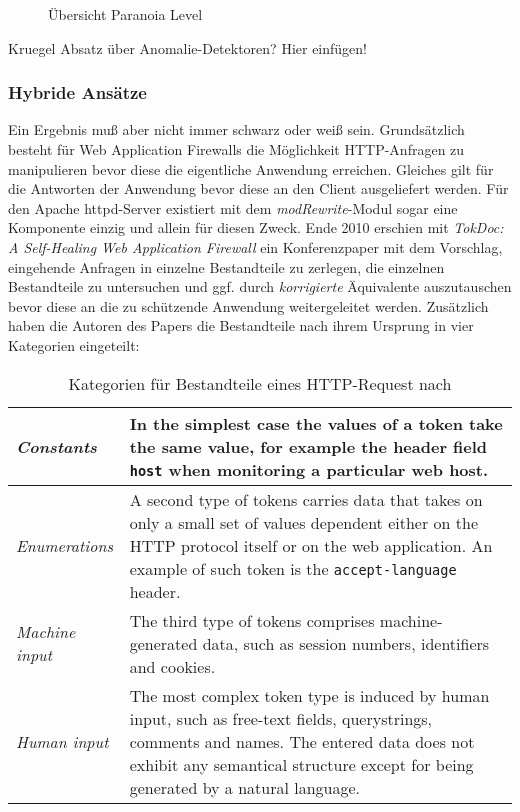 \begin{figure}[ht]
  \centering
  
  \caption{Übersicht Paranoia Level \cite{owaspcrs}}
  \label{fig.paranoia}
\end{figure}



\begin{neu}
  Kruegel Absatz über Anomalie-Detektoren? Hier einfügen!
\end{neu}

\subsubsection{Hybride Ansätze} %
Ein Ergebnis muß aber nicht immer schwarz oder weiß sein.  Grundsätzlich besteht für Web Application Firewalls die Möglichkeit HTTP-Anfragen zu manipulieren bevor diese die eigentliche Anwendung erreichen. Gleiches gilt für die Antworten der Anwendung bevor diese an den Client ausgeliefert werden. Für den Apache httpd-Server existiert mit dem \emph{modRewrite}-Modul sogar eine Komponente einzig und allein für diesen Zweck. Ende 2010 erschien mit \glqq\emph{TokDoc: A Self-Healing Web Application Firewall}\grqq \cite{Krueger2010} ein Konferenzpaper mit dem Vorschlag, eingehende Anfragen in einzelne Bestandteile zu zerlegen, die einzelnen Bestandteile zu untersuchen und ggf. durch \emph{korrigierte} Äquivalente auszutauschen bevor diese an die zu schützende Anwendung weitergeleitet werden. Zusätzlich haben die Autoren des Papers die Bestandteile nach ihrem Ursprung in vier Kategorien eingeteilt:

\begin{table}[h]
  \centering
  \begin{tabular}{|l|p{8cm}|}
    \hline
    \emph{Constants} & In the simplest case the values of a token take the same value, for example the header field \verb=host= when monitoring a particular web host. \\
    \hline
    \emph{Enumerations} &  A second type of tokens carries data that takes on only a small set of values dependent either on the HTTP protocol itself or on the web application. An example of such token is the \verb=accept-language= header.\\
    \hline
    \emph{Machine input} & The third type of tokens comprises machine-generated data, such as session numbers, identifiers and cookies. \\
    \hline
    \emph{Human input} & The most complex token type is induced by human input, such as free-text fields, querystrings, comments and names. The entered data does not exhibit any semantical structure except for being generated by a natural language.  \\
    \hline
  \end{tabular}
  \caption{Kategorien für Bestandteile eines HTTP-Request  nach \cite{Krueger2010}}
  \label{tab:tocdoc}
\end{table}

